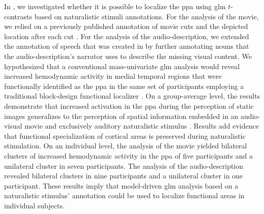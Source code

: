 

In \citet{haeusler2022processing}, we investigated whether it is possible to
localize the \ac{ppa} using \ac{glm} $t$-contrasts based on naturalistic stimuli
annotations.
For the analysis of the movie, we relied on a previously published annotation of
movie cuts and the depicted location after each cut \citep{haeusler2016cutanno}.
For the analysis of the audio-description, we extended the annotation of speech
that was created in \citet{haeusler2021speechanno} by further annotating nouns
that the audio-description's narrator uses to describe the missing visual
content.
We hypothesized that a conventional mass-univariate \ac{glm} analysis would
reveal increased hemodynamic activity in medial temporal regions that were
functionally identified as the \ac{ppa} in the same set of participants
employing a traditional block-design functional localizer
\citep{sengupta2016extension}.
On a group-average level, the results demonstrate that increased activation in
the \ac{ppa} during the perception of static images generalizes to the
perception of spatial information embedded in an audio-visual movie and
exclusively auditory naturalistic stimulus \citep{haeusler2022processing}.
Results add evidence \citep[cf.][]{bartels2004mapping} that functional
specialization of cortical areas is preserved during naturalistic stimulation.
On an individual level, the analysis of the movie yielded bilateral clusters of
increased hemodynamic activity in the \ac{ppa} of five participants and a
unilateral cluster in seven participants.
%
The analysis of the audio-description revealed bilateral clusters in nine
participants and a unilateral cluster in one participant.
%
These results imply that model-driven \ac{glm} analysis based on a naturalistic
stimulus' annotation could be used to localize functional areas in individual
subjects.


